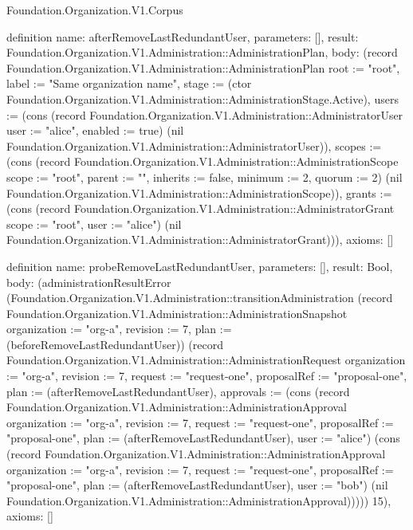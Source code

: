 \begin{lexlean}{Foundation.Organization.V1.Corpus}
\begin{semanticmodule}
definition{
  name: afterRemoveLastRedundantUser,
  parameters: [],
  result: Foundation.Organization.V1.Administration::AdministrationPlan,
  body: (record Foundation.Organization.V1.Administration::AdministrationPlan {root := "root", label := "Same organization name", stage := (ctor Foundation.Organization.V1.Administration::AdministrationStage.Active), users := (cons (record Foundation.Organization.V1.Administration::AdministratorUser {user := "alice", enabled := true}) (nil Foundation.Organization.V1.Administration::AdministratorUser)), scopes := (cons (record Foundation.Organization.V1.Administration::AdministrationScope {scope := "root", parent := "", inherits := false, minimum := 2, quorum := 2}) (nil Foundation.Organization.V1.Administration::AdministrationScope)), grants := (cons (record Foundation.Organization.V1.Administration::AdministratorGrant {scope := "root", user := "alice"}) (nil Foundation.Organization.V1.Administration::AdministratorGrant))}),
  axioms: []
}

definition{
  name: probeRemoveLastRedundantUser,
  parameters: [],
  result: Bool,
  body: (administrationResultError (Foundation.Organization.V1.Administration::transitionAdministration (record Foundation.Organization.V1.Administration::AdministrationSnapshot {organization := "org-a", revision := 7, plan := (beforeRemoveLastRedundantUser)}) (record Foundation.Organization.V1.Administration::AdministrationRequest {organization := "org-a", revision := 7, request := "request-one", proposalRef := "proposal-one", plan := (afterRemoveLastRedundantUser), approvals := (cons (record Foundation.Organization.V1.Administration::AdministrationApproval {organization := "org-a", revision := 7, request := "request-one", proposalRef := "proposal-one", plan := (afterRemoveLastRedundantUser), user := "alice"}) (cons (record Foundation.Organization.V1.Administration::AdministrationApproval {organization := "org-a", revision := 7, request := "request-one", proposalRef := "proposal-one", plan := (afterRemoveLastRedundantUser), user := "bob"}) (nil Foundation.Organization.V1.Administration::AdministrationApproval)))})) 15),
  axioms: []
}


\end{semanticmodule}
\end{lexlean}
